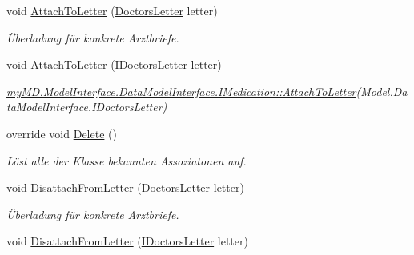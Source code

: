 \begin{CompactItemize}
\item 
void \hyperlink{classmy_m_d_1_1_model_1_1_data_model_1_1_medication_f33d09abc414149017c4c8029c0d2d3a}{Attach\-To\-Letter} (\hyperlink{classmy_m_d_1_1_model_1_1_data_model_1_1_doctors_letter}{Doctors\-Letter} letter)
\begin{CompactList}\small\item\em \"{U}berladung f\"{u}r konkrete Arztbriefe. \item\end{CompactList}\item 
\hypertarget{classmy_m_d_1_1_model_1_1_data_model_1_1_medication_4e9eb33eb2d50445faed1fb21b100083}{
void \hyperlink{classmy_m_d_1_1_model_1_1_data_model_1_1_medication_4e9eb33eb2d50445faed1fb21b100083}{Attach\-To\-Letter} (\hyperlink{interfacemy_m_d_1_1_model_interface_1_1_data_model_interface_1_1_i_doctors_letter}{IDoctors\-Letter} letter)}
\label{d0/daf/classmy_m_d_1_1_model_1_1_data_model_1_1_medication_4e9eb33eb2d50445faed1fb21b100083}

\begin{CompactList}\small\item\em \hyperlink{interfacemy_m_d_1_1_model_interface_1_1_data_model_interface_1_1_i_medication_4e9eb33eb2d50445faed1fb21b100083}{my\-MD.Model\-Interface.Data\-Model\-Interface.IMedication::Attach\-To\-Letter}(Model.Data\-Model\-Interface.IDoctors\-Letter) \item\end{CompactList}\item 
override void \hyperlink{classmy_m_d_1_1_model_1_1_data_model_1_1_medication_51a833214dab53bfafb630573fc0fe77}{Delete} ()
\begin{CompactList}\small\item\em L\"{o}st alle der Klasse bekannten Assoziatonen auf. \item\end{CompactList}\item 
void \hyperlink{classmy_m_d_1_1_model_1_1_data_model_1_1_medication_bb5c98e4dca1fcd06f87205e264503fc}{Disattach\-From\-Letter} (\hyperlink{classmy_m_d_1_1_model_1_1_data_model_1_1_doctors_letter}{Doctors\-Letter} letter)
\begin{CompactList}\small\item\em \"{U}berladung f\"{u}r konkrete Arztbriefe. \item\end{CompactList}\item 
\hypertarget{classmy_m_d_1_1_model_1_1_data_model_1_1_medication_d1ca6f76b75fe87eac94cbac8bc61322}{
void \hyperlink{classmy_m_d_1_1_model_1_1_data_model_1_1_medication_d1ca6f76b75fe87eac94cbac8bc61322}{Disattach\-From\-Letter} (\hyperlink{interfacemy_m_d_1_1_model_interface_1_1_data_model_interface_1_1_i_doctors_letter}{IDoctors\-Letter} letter)}
\label{d0/daf/classmy_m_d_1_1_model_1_1_data_model_1_1_medication_d1ca6f76b75fe87eac94cbac8bc61322}


\end{CompactItemize}
